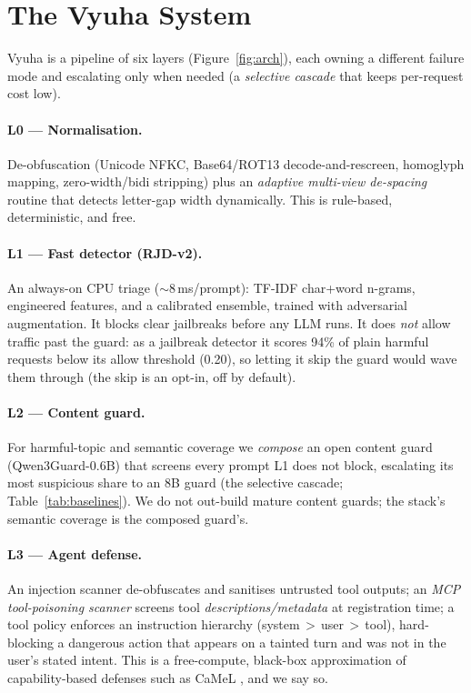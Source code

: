 \documentclass[11pt]{article}
\begin{document}
\section{The Vyuha System}
Vyuha is a pipeline of six layers (Figure~\ref{fig:arch}), each owning a different failure mode and
escalating only when needed (a \emph{selective cascade} that keeps per-request cost low).

\paragraph{L0 --- Normalisation.} De-obfuscation (Unicode NFKC, Base64/ROT13 decode-and-rescreen,
homoglyph mapping, zero-width/bidi stripping) plus an \emph{adaptive multi-view de-spacing} routine
that detects letter-gap width dynamically. This is rule-based, deterministic, and free.

\paragraph{L1 --- Fast detector (RJD-v2).} An always-on CPU triage ($\sim$8\,ms/prompt):
TF-IDF char+word n-grams, engineered features, and a calibrated ensemble, trained with adversarial
augmentation. It blocks clear jailbreaks before any LLM runs. It does \emph{not} allow traffic past
the guard: as a jailbreak detector it scores 94\% of plain harmful requests below its allow threshold
(0.20), so letting it skip the guard would wave them through (the skip is an opt-in, off by default).

\paragraph{L2 --- Content guard.} For harmful-topic and semantic coverage we \emph{compose} an open
content guard (Qwen3Guard-0.6B) that screens every prompt L1 does not block, escalating its most
suspicious share to an 8B guard (the selective cascade; Table~\ref{tab:baselines}). We do not out-build mature
content guards; the stack's semantic coverage is the composed guard's.

\paragraph{L3 --- Agent defense.} An injection scanner de-obfuscates and sanitises untrusted tool
outputs; an \emph{MCP tool-poisoning scanner} screens tool \emph{descriptions/metadata} at
registration time; a tool policy enforces an instruction hierarchy (system\,$>$\,user\,$>$\,tool),
hard-blocking a dangerous action that appears on a tainted turn and was not in the user's stated
intent. This is a free-compute, black-box approximation of capability-based defenses such as CaMeL
\citep{camel}, and we say so.
\end{document}
